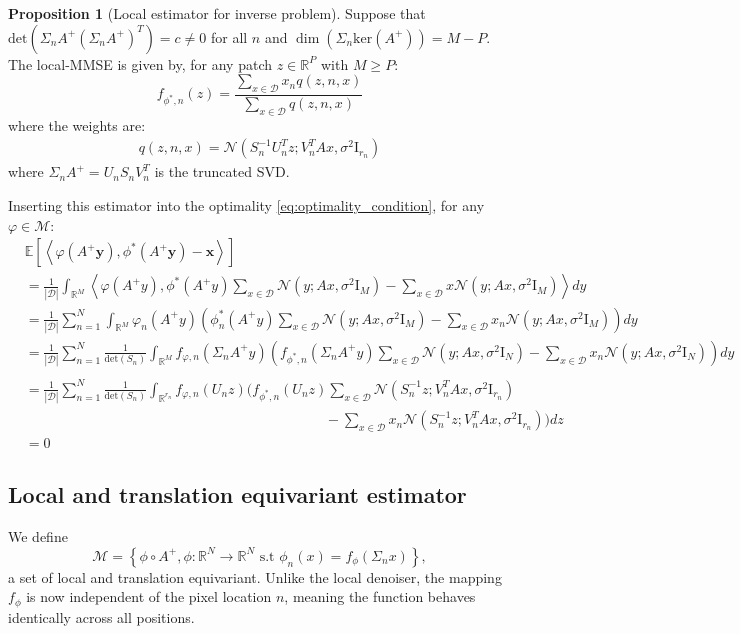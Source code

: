 \documentclass[a4paper,10pt]{article}
\theoremstyle{definition} %
\theoremstyle{definition} %
\newtheorem{proposition}[definition]{Proposition}
\theoremstyle{definition} %
\theoremstyle{definition} %
\newcommand{\R}{\mathbb{R}}
\newcommand{\E}[1]{\mathbb{E} \left[ {#1} \right] }
\newcommand{\Normal}[1]{\mathcal{N}\left( {#1} \right)}
\renewcommand{\ker}[1]{\mathrm{ker}\left( {#1} \right)}
\newcommand{\Id}{\mathrm{I}}
\newcommand{\inner}[1]{\left\langle #1 \right\rangle}
\newcommand{\M}{\mathcal{M}}
\newcommand{\x}{\boldsymbol{x}}
\newcommand{\y}{\boldsymbol{y}}
\newcommand{\0}{\boldsymbol{0}}
\newcommand{\D}{\mathcal{D}}
\renewcommand{\det}[1]{\mathrm{det}\left( #1 \right)}
\begin{document}
\begin{proposition}[Local estimator for inverse problem]
    Suppose that $\det{\Sigma_n A^+ (\Sigma_n A^+)^T} = c \neq 0$ for all $n$ and $\dim(\Sigma_n \ker{A^+}) = M - P$.
    The local-MMSE is given by, for any patch $z \in \R^P$ with $M \geqslant P$: 
    \begin{equation*}
        f_{\phi^*, n}(z) = \frac{\sum_{x \in \D} x_n q(z, n, x)}{\sum_{x \in \D} q(z, n, x)}
    \end{equation*}
    where the weights are: 
    \begin{align*}
        q(z, n, x) = \Normal{S_{n}^{-1} U_{n}^T z; V_{n}^T A x, \sigma^2 \Id_{r_n}}
    \end{align*}
    where $\Sigma_n A^+ = U_n S_n V_n^T$ is the truncated SVD. 
\end{proposition}
Inserting this estimator into the optimality \cref{eq:optimality_condition}, for any $\varphi \in \M$:
\begin{align*}
    &\E{\inner{\varphi(A^+ \y), \phi^*(A^+  \y) - \x}}  \\
    &=  \frac{1}{|\D|} \int_{\R^M} \inner{\varphi(A^+  y), \phi^*(A^+  y) \sum_{x \in \D} \Normal{y; A x, \sigma^2 \Id_M} - \sum_{x \in \D} x \Normal{y; A x, \sigma^2 \Id_M}} dy \\
    &=  \frac{1}{|\D|} \sum_{n = 1}^{N} \int_{\R^M} \varphi_n (A^+  y) \left( \phi^*_n(A^+  y) \sum_{x \in \D} \Normal{y; A x, \sigma^2 \Id_M} - \sum_{x \in \D} x_n \Normal{y; A x, \sigma^2 \Id_M} \right) dy \\
    &=  \frac{1}{|\D|} \sum_{n = 1}^{N} \frac{1}{\det{S_n}} \int_{\R^M} f_{\varphi, n} (\Sigma_n A^+  y) \left( f_{\phi^*, n}(\Sigma_n A^+  y) \sum_{x \in \D} \Normal{y; A x, \sigma^2 \Id_N} - \sum_{x \in \D} x_n \Normal{y; A x, \sigma^2 \Id_N} \right) dy \\
    \\&= \frac{1}{|\D|} \sum_{n = 1}^{N} \frac{1}{\det{S_n}} \int_{\R^{r_n}} f_{\varphi, n} (U_{n}  z)  \Big(   f_{\phi^*, n}(U_{n}  z) \sum_{x \in \D} \Normal{S_{n}^{-1} z; V_{n}^T A x, \sigma^2 \Id_{r_n}} \\
    &\hspace{9cm} - \sum_{x \in \D} x_n \Normal{S_{n}^{-1} z; V_{n}^T A x, \sigma^2 \Id_{r_n}} \Big) dz
    \\&= 0
\end{align*}

\subsection{Local and translation equivariant estimator}
We define
\begin{equation}
    \M = \left\{\phi \circ A^+, \phi: \R^N \to \R^N \mbox{ s.t } \phi_n(x) = f_{\phi}(\Sigma_n x)\right\},
\end{equation}
a set of local and translation equivariant. Unlike the local denoiser, the mapping $f_{\phi}$ is now independent of the pixel location $n$, meaning the function behaves identically across all positions.
\end{document}
